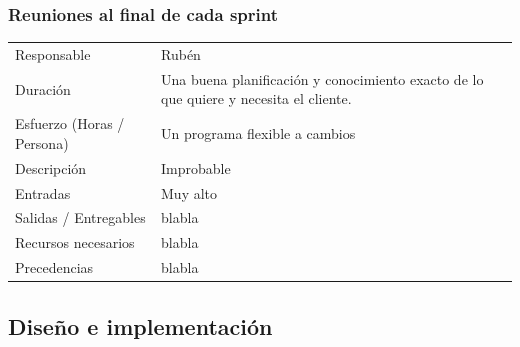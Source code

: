\subsubsection{Reuniones al final de cada sprint}
\begin{table}[H]
    \begin{center}
        \begin{tabular}{l p{8cm}}
            Responsable                           & Rub\'{e}n \\
            Duraci\'{o}n                          & Una buena planificación y conocimiento exacto de lo que quiere y necesita el cliente. \\ 
            Esfuerzo (Horas / Persona)            & Un programa flexible a cambios \\
            Descripci\'{o}n                       & Improbable \\
            Entradas                              & Muy alto\\
            Salidas / Entregables                 & blabla \\
            Recursos necesarios                   & blabla \\
            Precedencias                          & blabla \\
        \end{tabular}
    \end{center}
    
\end{table}

\subsection{Dise\~{n}o e implementaci\'{o}n}
